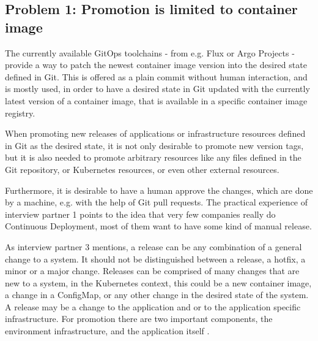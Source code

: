 \subsection{Problem 1: Promotion is limited to container image}
\label{problem1}

The currently available GitOps toolchains -
from e.g. Flux or Argo Projects -
provide a way to patch the newest container image version
into the desired state defined in Git.
This is offered as a plain commit without human interaction,
and is mostly used, in order to have a desired state in Git updated with
the currently latest version of a container image,
that is available in a specific container image registry.

When promoting new releases of applications or infrastructure resources defined in Git as the 
desired state, it is not only desirable to promote new version tags,
but it is also needed to promote arbitrary resources like any files
defined in the Git repository,
or Kubernetes resources, or even other external resources.


Furthermore, it is desirable to have a human approve the changes,
which are done by a machine, e.g. with the help of Git pull requests.
The practical experience of interview partner 1 points to the idea that
very few companies really do Continuous Deployment, most of them want to have some kind of manual release.


As interview partner 3 mentions, a release can be any combination of a general change to a system.
It should not be distinguished between a release, a hotfix, a minor or a major change.
Releases can be comprised of many changes that are new to a system,
in the Kubernetes context, this could be a new container image,
a change in a ConfigMap, or any other change in the desired state of the system.
A release may be a change to the application and or to the application specific infrastructure.
For promotion there are two important components,
the environment infrastructure, and the application itself
\autocite{gitopsAndKubernetes2021continuous}.


